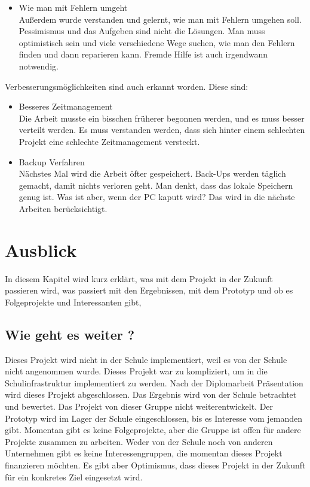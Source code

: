 \begin{itemize}
	\item Wie man mit Fehlern umgeht \\
	
	Außerdem wurde verstanden und gelernt, wie man mit Fehlern umgehen soll. Pessimismus und das Aufgeben sind nicht die Lösungen. Man muss optimistisch sein und viele verschiedene Wege suchen, wie man den Fehlern finden und dann reparieren kann. Fremde Hilfe ist auch irgendwann notwendig.
\end{itemize}	
	 Verbesserungsmöglichkeiten sind auch erkannt worden. Diese sind: 
\begin{itemize}	
	
	\item Besseres Zeitmanagement \\
	
	Die Arbeit musste ein bisschen früherer begonnen werden, und es muss besser verteilt werden. Es muss verstanden werden, dass sich hinter einem schlechten Projekt eine schlechte Zeitmanagement versteckt.
	
	\item Backup Verfahren \\
	
	Nächstes Mal wird die Arbeit öfter gespeichert. Back-Ups werden täglich gemacht, damit nichts verloren geht. Man denkt, dass das lokale Speichern genug ist. Was ist aber, wenn der PC kaputt wird? Das wird in die nächste Arbeiten berücksichtigt.
\end{itemize}

\chapter{Ausblick}
In diesem Kapitel wird kurz erkl\"art, was mit dem Projekt in der Zukunft passieren wird, was passiert mit den Ergebnissen, mit dem Prototyp und ob es Folgeprojekte und Interessanten gibt,
\section{Wie geht es weiter ?}
Dieses Projekt wird nicht in der Schule implementiert, weil es von der Schule nicht angenommen wurde. Dieses Projekt war zu kompliziert, um in die Schulinfrastruktur implementiert zu werden. Nach der Diplomarbeit Präsentation wird dieses Projekt abgeschlossen. Das Ergebnis wird von der Schule betrachtet und bewertet. Das Projekt von dieser Gruppe nicht weiterentwickelt. Der Prototyp wird im Lager der Schule eingeschlossen, bis es Interesse vom jemanden gibt. Momentan gibt es keine Folgeprojekte, aber die Gruppe ist offen für andere Projekte zusammen zu arbeiten. Weder von der Schule noch von anderen Unternehmen gibt es keine Interessengruppen, die momentan dieses Projekt finanzieren möchten. Es gibt aber Optimismus, dass dieses Projekt in der Zukunft für ein konkretes Ziel eingesetzt wird.